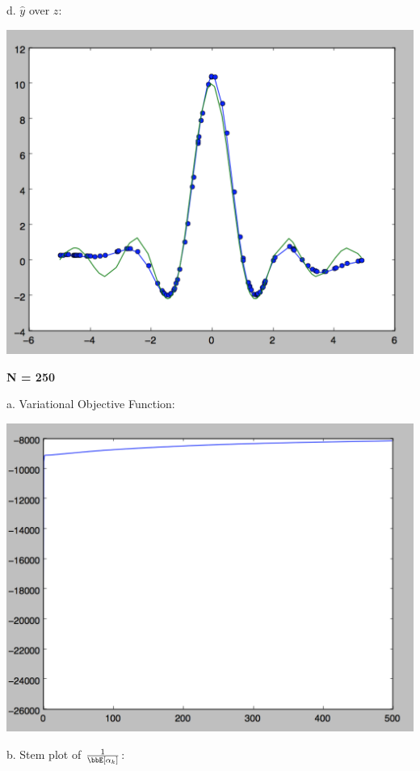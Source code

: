\documentclass[twoside,11pt]{homework}
\begin{document}
d. $\hat{y}$ over $z$:

\includegraphics[scale=.5]{images/1yhat.png}

\textbf{N = 250}

a. Variational Objective Function:

\includegraphics[scale=.5]{images/2objfunc.png}

b. Stem plot of $\frac{1}{\bbE[\alpha_k]}$:
\end{document}

